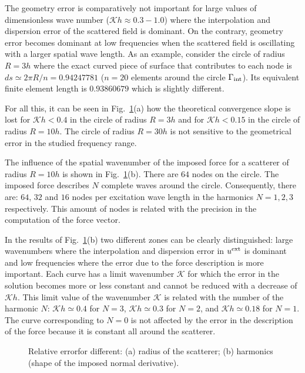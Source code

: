 \documentclass[12pt]{article}
\newcommand{\rin}{{\rm int}}
\newcommand{\rex}{{\rm ext}}
\newcommand{\K}{\mathcal{K}}
\newcommand{\hfrac}[2]{#1 / #2} \newcommand{\fig}{Fig.~}
\newcommand{\fref}[1]{Fig.~\ref{#1}}
\begin{document}
The geometry error is comparatively not important for large values of dimensionless wave number ($\K h \approx 0.3-1.0$) where the interpolation and dispersion error of the scattered field is dominant. On the contrary, geometry error becomes dominant at low frequencies when the scattered field is oscillating with a larger spatial wave length. As an example, consider the circle of radius $R = 3h$ where the exact curved piece of surface that contributes to each node is $ds \simeq \hfrac{2\pi R}{n} = 0.94247781$ ($n=20$ elements around the circle $\Gamma_\rin$). Its equivalent finite element length is $0.93860679$ which is slightly different.

For all this, it can be seen in  \fref{fig:InfluenceOfRadiusAndHarmonic}(a) how the theoretical convergence slope is lost for $\K h < 0.4$ in the circle of radius $R = 3h$ and for $\K h < 0.15$ in the circle of radius $R = 10h$. The circle of radius $R = 30h$ is not sensitive to the geometrical error in the studied frequency range.

The influence of the spatial wavenumber of the imposed force for a scatterer of radius $R = 10 h$ is shown in \fref{fig:InfluenceOfRadiusAndHarmonic}(b). There are $64$ nodes on the circle. The imposed force describes $N$ complete waves around the circle. Consequently, there are: $64$, $32$ and $16$ nodes per excitation wave length in the harmonics  $N=1,2,3$ respectively. This amount of nodes is related with the precision in the computation of the force vector. 

In the results of \fref{fig:InfluenceOfRadiusAndHarmonic}(b) two different zones can be clearly distinguished: large wavenumbers where the interpolation and dispersion error in $u^{\rex}$ is dominant and low frequencies where the error due to the force description is more important. Each curve has a limit wavenumber $\K$ for which the error in the solution becomes more or less constant and cannot be reduced with a decrease of $\K h$.  This limit value of the wavenumber $\K$ is related with the number of the harmonic $N$: $\K h \simeq 0.4$ for $N=3$, $\K h \simeq 0.3$ for $N=2$,  and $\K h \simeq 0.18$ for $N=1$. The curve corresponding to $N = 0$ is not affected by the error in the description of the force because it is constant all around the scatterer.

\begin{figure}[ht]
 
\caption{Relative errorfor different: (a) radius of the scatterer; (b) harmonics (shape of the imposed normal derivative).}
\label{fig:InfluenceOfRadiusAndHarmonic}
\end{figure}
\end{document}
